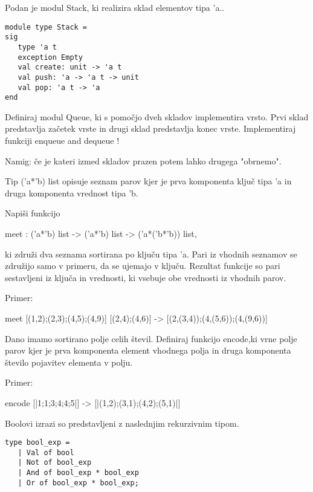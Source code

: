\begin{ex}
\end{ex} \begin{ex}
Podan je modul Stack, ki realizira sklad elementov tipa 'a.. 

\begin{verbatim}
module type Stack = 
sig 
   type 'a t 
   exception Empty 
   val create: unit -> 'a t 
   val push: 'a -> 'a t -> unit 
   val pop: 'a t -> 'a 
end

\end{verbatim}
Definiraj modul Queue, ki s pomo\v cjo dveh skladov implementira vrsto. Prvi sklad predstavlja za\v cetek vrste in drugi sklad predstavlja konec vrste. Implementiraj funkciji enqueue and dequeue !

Namig: \v ce je kateri izmed skladov prazen potem lahko drugega "obrnemo". 


\end{ex} \begin{ex}
Tip ('a*'b) list opisuje seznam parov kjer je prva komponenta klju\v c tipa 'a in druga komponenta vrednost tipa 'b. 

Napi\v si funkcijo 

meet : ('a*'b) list -> ('a*'b) list -> ('a*('b*'b)) list,

ki zdru\v zi dva seznama sortirana po klju\v cu tipa 'a. Pari iz vhodnih seznamov se zdru\v zijo samo v primeru, da se ujemajo v klju\v cu. Rezultat funkcije so pari sestavljeni iz klju\v ca in vrednosti, ki vsebuje obe vrednosti iz vhodnih parov.  

Primer:    

meet [(1,2);(2,3);(4,5);(4,9)] [(2,4);(4,6)] -> 
     [(2,(3,4));(4,(5,6));(4,(9,6))]


\end{ex} \begin{ex}
Dano imamo sortirano polje celih \v stevil. Definiraj funkcijo encode,ki vrne polje parov kjer je prva komponenta element vhodnega polja in druga komponenta \v stevilo pojavitev elementa v polju.   

Primer:

encode [|1;1;3;4;4;5|] -> [|(1,2);(3,1);(4,2);(5,1)|]


\end{ex} \begin{ex}
Boolovi izrazi so predstavljeni z naslednjim rekurzivnim tipom.   

\begin{verbatim}
type bool_exp =
   | Val of bool
   | Not of bool_exp
   | And of bool_exp * bool_exp
   | Or of bool_exp * bool_exp;


\end{verbatim}
\end{ex}
